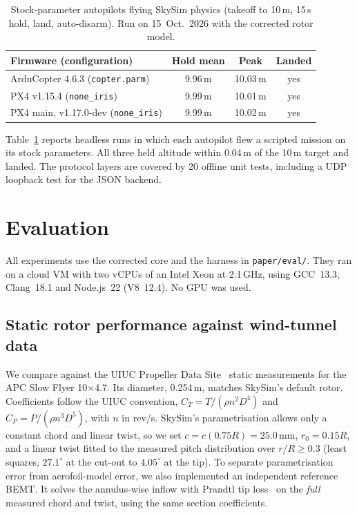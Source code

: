 \documentclass{ieeeaccess}
\newcommand{\skysim}{SkySim\xspace}
\begin{document}
\begin{table}[t]
\centering
\caption{Stock-parameter autopilots flying \skysim physics (takeoff to 10\,m,
15\,s hold, land, auto-disarm). Run on 15~Oct.~2026 with the corrected rotor
model.}
\label{tab:sitl}
\footnotesize
\begin{tabular}{@{}lccc@{}}
\toprule
Firmware (configuration) & Hold mean & Peak & Landed \\
\midrule
ArduCopter 4.6.3 (\texttt{copter.parm}) & 9.96\,m & 10.03\,m & yes \\
PX4 v1.15.4 (\texttt{none\_iris}) & 9.99\,m & 10.01\,m & yes \\
PX4 main, v1.17.0-dev (\texttt{none\_iris}) & 9.99\,m & 10.02\,m & yes \\
\bottomrule
\end{tabular}
\end{table}

Table~\ref{tab:sitl} reports headless runs in which each autopilot flew a
scripted mission on its stock parameters. All three held altitude within
0.04\,m of the 10\,m target and landed. The protocol layers are covered by 20
offline unit tests, including a UDP loopback test for the JSON backend.

\section{Evaluation}
\label{sec:eval}

All experiments use the corrected core and the harness in
\texttt{paper/eval/}. They ran on a cloud VM with two vCPUs of an Intel Xeon
at 2.1\,GHz, using GCC~13.3, Clang~18.1 and Node.js~22 (V8~12.4). No GPU was
used.

\subsection{Static rotor performance against wind-tunnel data}
\label{sec:val-static}

We compare against the UIUC Propeller Data Site~\cite{uiucpropdb,brandt2011propeller}
static measurements for the APC Slow Flyer 10$\times$4.7. Its diameter, 0.254\,m,
matches \skysim's default rotor. Coefficients follow the UIUC convention,
$C_T=T/(\rho n^2D^4)$ and $C_P=P/(\rho n^3D^5)$, with $n$ in rev/s. \skysim's
parametrisation allows only a constant chord and linear twist, so we set
$c=c(0.75R)=25.0$\,mm, $r_0=0.15R$, and a linear twist fitted to the measured
pitch distribution over $r/R\ge0.3$ (least squares, $27.1^\circ$ at the cut-out
to $4.05^\circ$ at the tip). To separate
parametrisation error from aerofoil-model error, we also implemented an
independent reference BEMT. It solves the annulus-wise inflow with Prandtl tip
loss~\cite{leishman2006principles} on the \emph{full} measured chord and twist,
using the same section coefficients.
\end{document}
